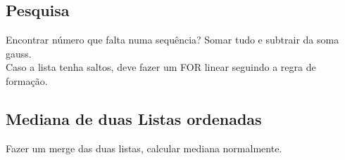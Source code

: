\subsection*{Pesquisa}
Encontrar número que falta numa sequência?
Somar tudo e subtrair da soma gauss.\\
Caso a lista tenha saltos, deve fazer um FOR linear seguindo a regra de formação.

\subsection*{Mediana de duas Listas ordenadas}
Fazer um merge das duas listas,
calcular mediana normalmente.

